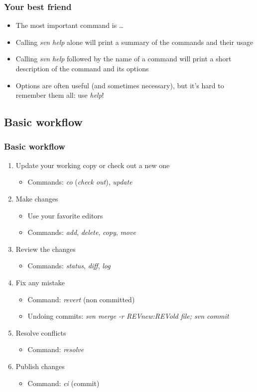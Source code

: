 \documentclass{beamer}
\begin{document}
\frame
{
  \frametitle{Your best friend}
  
  \begin{itemize}
  \item<1-> The most important command is \dots
  		  \uncover<2->{\textit{help}}
  \item<3-> Calling \textit{svn help} alone will print a summary of the commands and their usage
  \item<4-> Calling \textit{svn help} followed by the name of a command will print a short description of the command and its options
  \item<5-> Options are often useful (and sometimes necessary), but it's hard to remember them all: use \textit{help}!
  \end{itemize}

}

\subsection{Basic workflow}

\frame
{
  \frametitle{Basic workflow}
  
  \begin{enumerate}
  \item<1-> Update your working copy or check out a new one
  	\begin{itemize}
  	\item<1-> Commands: \textit{co} (\textit{check out}), \textit{update}
  	\end{itemize}
  \item<2-> Make changes
  	\begin{itemize}
	\item<2-> Use your favorite editors
	\item<2-> Commands: \textit{add}, \textit{delete}, \textit{copy}, \textit{move}
	\end{itemize}
  \item<3-> Review the changes
  	\begin{itemize}
	\item<3-> Commands: \textit{status}, \textit{diff}, \textit{log}
	\end{itemize}
  \item<4-> Fix any mistake
  	\begin{itemize}
	\item<4-> Command: \textit{revert} (non committed) 
	 \item<4->  Undoing commits:  \textit{svn merge -r REVnew:REVold file; svn commit}
	\end{itemize}
  \item<5-> Resolve conflicts
  	\begin{itemize}
	\item<4-> Command: \textit{resolve}
	\end{itemize}
  \item<6-> Publish changes
  	\begin{itemize}
	\item<4-> Command: \textit{ci} (commit)
	\end{itemize}
  \end{enumerate}

}
\end{document}
